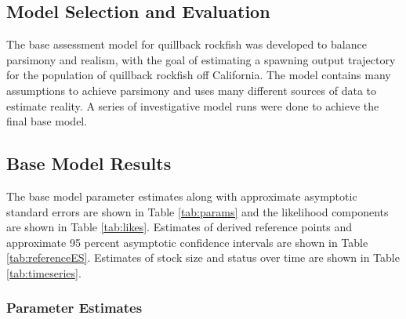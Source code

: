 \documentclass[11pt,
  english,
  letterpaper,
]{article}
\begin{document}
\leavevmode\tagmcend\tagstructend\par


\hypertarget{model-selection-and-evaluation}{%
\subsection{Model Selection and Evaluation}\label{model-selection-and-evaluation}}

\leavevmode\tagmcend\tagstructend


The base assessment model for quillback rockfish was developed to balance parsimony and realism, with the goal of estimating a spawning output trajectory for the population of quillback rockfish off California. The model contains many assumptions to achieve parsimony and uses many different sources of data to estimate reality. A series of investigative model runs were done to achieve the final base model.

\leavevmode\tagmcend\tagstructend\par


\hypertarget{base-model-results}{%
\subsection{Base Model Results}\label{base-model-results}}

\leavevmode\tagmcend\tagstructend


The base model parameter estimates along with approximate asymptotic standard errors are shown in Table \ref{tab:params} and the likelihood components are shown in Table \ref{tab:likes}. Estimates of derived reference points and approximate 95 percent asymptotic confidence intervals are shown in Table \ref{tab:referenceES}. Estimates of stock size and status over time are shown in Table \ref{tab:timeseries}.

\leavevmode\tagmcend\tagstructend\par


\hypertarget{parameter-estimates}{%
\subsubsection{Parameter Estimates}\label{parameter-estimates}}
\end{document}
